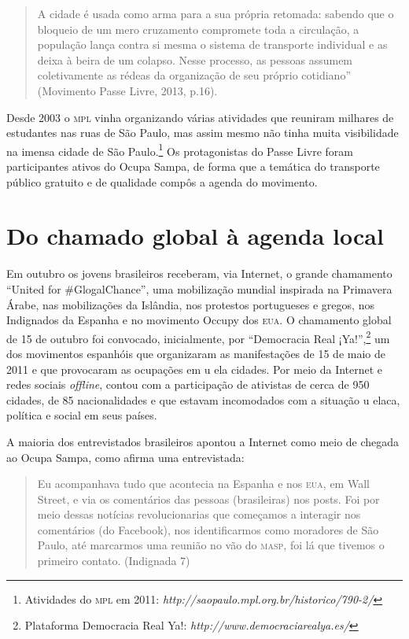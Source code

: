 \begin{quote}
A cidade é usada como arma para a sua própria retomada: sabendo que o
bloqueio de um mero cruzamento compromete toda a circulação, a população
lança contra si mesma o sistema de transporte individual e as deixa à
beira de um colapso. Nesse processo, as pessoas assumem coletivamente as
rédeas da organização de seu próprio cotidiano'' (Movimento Passe Livre,
2013, p.16).
\end{quote}

Desde 2003 o \textsc{mpl} vinha organizando várias atividades que reuniram
milhares de estudantes nas ruas de São Paulo, mas assim mesmo não tinha
muita visibilidade na imensa cidade de São Paulo.\footnote{Atividades do
  \textsc{mpl} em 2011: \emph{http://saopaulo.mpl.org.br/historico/790-2/}} Os
protagonistas do Passe Livre foram participantes ativos do Ocupa
Sampa, de forma que a temática do transporte público gratuito e de
qualidade compôs a agenda do movimento.

\section{Do chamado global à agenda local}

\noindent{}Em outubro os jovens brasileiros receberam, via Internet, o grande
chamamento ``United for \#GlogalChance'', uma mobilização mundial
inspirada na Primavera Árabe, nas mobilizações da Islândia, nos
protestos portugueses e gregos, nos Indignados da Espanha e no movimento
Occupy dos \textsc{eua}. O chamamento global de 15 de outubro foi convocado,
inicialmente, por ``Democracia Real ¡Ya!'',\footnote{Plataforma
  Democracia Real Ya!: \emph{http://www.democraciarealya.es/}} um dos
movimentos espanhóis que organizaram as manifestações de 15 de maio de
2011 e que provocaram as ocupações em u ela cidades. Por meio da
Internet e redes sociais \emph{offline}, contou com a participação de ativistas
de cerca de 950 cidades, de 85 nacionalidades e que estavam
incomodados com a situação u elaca, política e social em seus países.

A maioria dos entrevistados brasileiros apontou a Internet como
meio de chegada ao Ocupa Sampa, como afirma uma entrevistada:

\begin{quote}
Eu acompanhava tudo que acontecia na Espanha e nos \textsc{eua}, em Wall Street,
e via os comentários das pessoas (brasileiras) nos posts. Foi por meio
dessas notícias revolucionarias que começamos a interagir nos
comentários (do Facebook), nos identificarmos como moradores de São
Paulo, até marcarmos uma reunião no vão do \textsc{masp}, foi lá que tivemos o
primeiro contato. (Indignada 7)
\end{quote}

